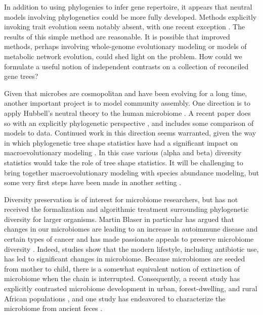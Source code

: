 \documentclass{amsart}
\begin{document}
In addition to using phylogenies to infer gene repertoire, it appears that neutral models involving phylogenetics could be more fully developed.
Methods explicitly invoking trait evolution seem notably absent, with one recent exception \cite{langille2013predictive}.
The results of this simple method are reasonable.
It is possible that improved methods, perhaps involving whole-genome evolutionary modeling or models of metabolic network evolution, could shed light on the problem.
How could we formulate a useful notion of independent contrasts \citep{felsenstein1985phylogenies} on a collection of reconciled gene trees?

Given that microbes are cosmopolitan and have been evolving for a long time, another important project is to model community assembly.
One direction is to apply Hubbell's neutral theory to the human microbiome \citep{fierer2012animalcules,costello2012application}.
A recent paper does so with an explicitly phylogenetic perspective \citep{o2012phylogenetic}, and includes some comparison of models to data.
Continued work in this direction seems warranted, given the way in which phylogenetic tree shape statistics have had a significant impact on macroevolutionary modeling \cite{mooers1997inferring,aldous2011five}.
In this case various (alpha and beta) diversity statistics would take the role of tree shape statistics.
It will be challenging to bring together macroevolutionary modeling with species abundance modeling, but some very first steps have been made in another setting \citep{lambert2013predicting}.

Diversity preservation is of interest for microbiome researchers, but has not received the formalization and algorithmic treatment surrounding phylogenetic diversity for larger organisms.
Martin Blaser in particular has argued that changes in our microbiomes are leading to an increase in autoimmune disease and certain types of cancer and has made passionate appeals to preserve microbiome diversity \cite{blaser2011antibiotic,cho2012human}.
Indeed, studies show that the modern lifestyle, including antibiotic use, has led to significant changes in microbiome.
Because microbiomes are seeded from mother to child, there is a somewhat equivalent notion of extinction of microbiome when the chain is interrupted.
Consequently, a recent study has explicitly contrasted microbiome development in urban, forest-dwelling, and rural African populations \cite{yatsunenko2012human}, and one study has endeavored to characterize the microbiome from ancient feces \cite{tito2012insights}.
\end{document}
